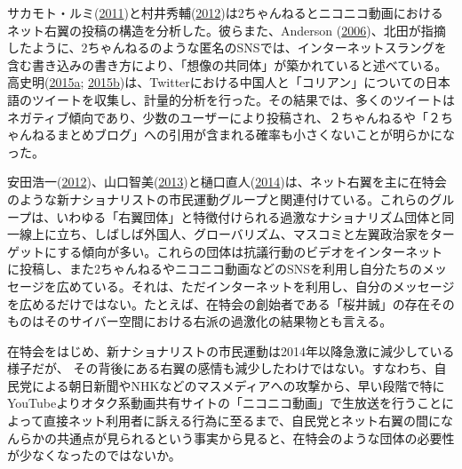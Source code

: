\documentclass[10pt,british,A4paper,oneside]{memoir}
\begin{document}
サカモト・ルミ(\protect\hyperlink{ref-sakamoto_koreans_2011}{2011})と村井秀輔(\protect\hyperlink{ref-murai_net_2012}{2012})は2ちゃんねるとニコニコ動画におけるネット右翼の投稿の構造を分析した。彼らまた、Anderson
(\protect\hyperlink{ref-anderson_imagined_2006}{2006})、北田が指摘したように、2ちゃんねるのような匿名のSNSでは、インターネットスラングを含む書き込みの書き方により、「想像の共同体」が築かれていると述べている。高史明(\protect\hyperlink{ref-taka_twitter_2015}{2015}\protect\hyperlink{ref-taka_twitter_2015}{a};
\protect\hyperlink{ref-taka_twitter_2015-1}{2015}\protect\hyperlink{ref-taka_twitter_2015-1}{b})は、Twitterにおける中国人と「コリアン」についての日本語のツイートを収集し、計量的分析を行った。その結果では、多くのツイートはネガティブ傾向であり、少数のユーザーにより投稿され、２ちゃんねるや「２ちゃんねるまとめブログ」への引用が含まれる確率も小さくないことが明らかになった。

安田浩一(\protect\hyperlink{ref-yasuda_eng:_2012}{2012})、山口智美(\protect\hyperlink{ref-yamaguchi_xenophobia_2013}{2013})と樋口直人(\protect\hyperlink{ref-higuchi_japans_2014}{2014})は、ネット右翼を主に在特会のような新ナショナリストの市民運動グループと関連付けている。これらのグループは、いわゆる「右翼団体」と特徴付けられる過激なナショナリズム団体と同一線上に立ち、しばしば外国人、グローバリズム、マスコミと左翼政治家をターゲットにする傾向が多い。これらの団体は抗議行動のビデオをインターネットに投稿し、また2ちゃんねるやニコニコ動画などのSNSを利用し自分たちのメッセージを広めている。それは、ただインターネットを利用し、自分のメッセージを広めるだけではない。たとえば、在特会の創始者である「桜井誠」の存在そのものはそのサイバー空間における右派の過激化の結果物とも言える。

在特会をはじめ、新ナショナリストの市民運動は2014年以降急激に減少している様子だが、
その背後にある右翼の感情も減少したわけではない。すなわち、自民党による朝日新聞やNHKなどのマスメディアへの攻撃から、早い段階で特にYouTubeよりオタク系動画共有サイトの「ニコニコ動画」で生放送を行うことによって直接ネット利用者に訴える行為に至るまで、自民党とネット右翼の間になんらかの共通点が見られるという事実から見ると、在特会のような団体の必要性が少なくなったのではないか。
\end{document}
